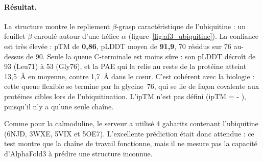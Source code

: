\paragraph{Résultat.} La structure montre le repliement \og $\beta$-grasp \fg{} caractéristique de l'ubiquitine : un feuillet $\beta$ enroulé autour d'une hélice $\alpha$ (figure~\ref{fig:af3_ubiquitine}). La confiance est très élevée : pTM de \textbf{0,86}, pLDDT moyen de \textbf{91,9}, 70 résidus sur 76 au-dessus de 90. Seule la queue C-terminale est moins sûre : son pLDDT décroît de 93 (Leu71) à 53 (Gly76), et la PAE qui la relie au reste de la protéine atteint 13,5~Å en moyenne, contre 1,7~Å dans le cœur. C'est cohérent avec la biologie : cette queue flexible se termine par la glycine~76, qui se lie de façon covalente aux protéines cibles lors de l'ubiquitination. L'ipTM n'est pas défini (\og ipTM = - \fg{}), puisqu'il n'y a qu'une seule chaîne.

Comme pour la calmoduline, le serveur a utilisé 4 gabarits contenant l'ubiquitine (6NJD, 3WXE, 5VIX et 5OE7). L'excellente prédiction était donc attendue : ce test montre que la chaîne de travail fonctionne, mais il ne mesure pas la capacité d'AlphaFold3 à prédire une structure inconnue.

